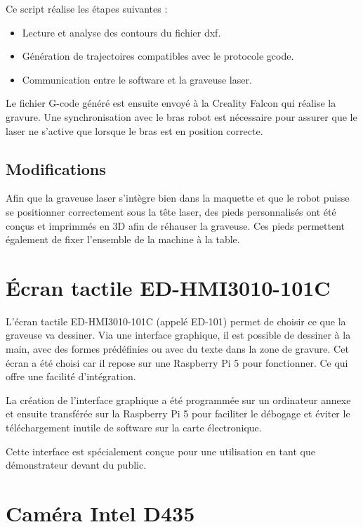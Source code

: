 Ce script réalise les étapes suivantes :
\begin{itemize}
    \item Lecture et analyse des contours du fichier \gls{dxf}.
    \item Génération de trajectoires compatibles avec le protocole \gls{gcode}.
    \item Communication entre le \gls{software} et la graveuse laser.
\end{itemize}

Le fichier G-code généré est ensuite envoyé à la Creality Falcon qui réalise la gravure. Une synchronisation avec le bras robot est nécessaire pour assurer que le laser ne s'active que lorsque le bras est en position correcte.

\subsection{Modifications}

Afin que la graveuse laser s'intègre bien dans la maquette et que le robot puisse se positionner correctement sous la tête laser, des pieds personnalisés ont été conçus et imprimmés en 3D afin de réhauser la graveuse. Ces pieds permettent également de fixer l'ensemble de la machine à la table.

\section{Écran tactile ED-HMI3010-101C}

L’écran tactile \gls{ED-HMI3010-101C} \cite{ED-101} (appelé ED-101) permet de choisir ce que la graveuse va dessiner. Via une interface graphique, il est possible de dessiner à la main, avec des formes prédéfinies ou avec du texte dans la zone de gravure.
Cet écran a été choisi car il repose sur une Raspberry Pi 5 pour fonctionner. Ce qui offre une facilité d'intégration.

La création de l'interface graphique a été programmée sur un ordinateur annexe et ensuite transférée sur la Raspberry Pi 5 pour faciliter le débogage et éviter le téléchargement inutile de \gls{software} sur la carte électronique.

Cette interface est spécialement conçue pour une utilisation en tant que démonstrateur devant du public.

\section{Caméra Intel D435}

